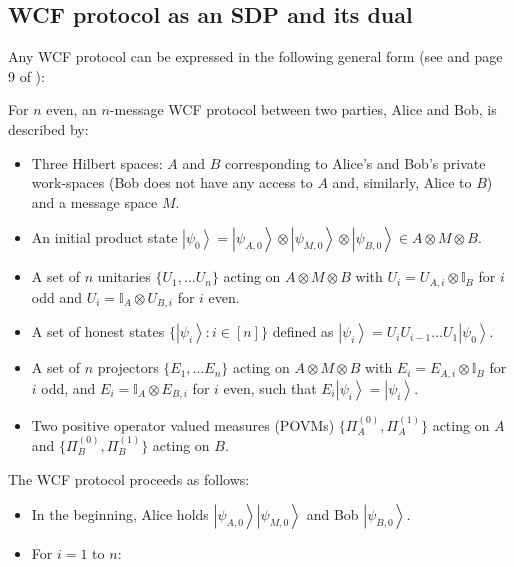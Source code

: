 \documentclass{theoretics}
\begin{document}
\subsection{WCF protocol as an SDP and its dual\label{subsec:sdp}}
Any WCF protocol can be expressed
in the following general form (see
\cite{Ambainis04b} and page 9 of \cite{Mochon07}): %
%

\begin{definition}
  \label{def:WCFprotocol}For $n$ even, an $n$-message WCF protocol
  between two parties, Alice and Bob, is described by:
  \begin{itemize}
    \item Three Hilbert spaces: $A$ and $B$ corresponding
          to Alice's and Bob's private work-spaces (Bob does not have any access
          to $A$ and, similarly, Alice to $B$) and a message space
          $M$.
    \item An initial product state $\left|\psi_{0}\right\rangle =\left|\psi_{A,0}\right\rangle \otimes\left|\psi_{M,0}\right\rangle \otimes\left|\psi_{B,0}\right\rangle \in A\otimes M\otimes B$.
    \item A set of $n$ unitaries $\{U_{1},\dots U_{n}\}$ acting on $A\otimes M\otimes B$
          with $U_{i}=U_{A,i}\otimes\mathbb{I}_{B}$ for $i$ odd
          and $U_{i}=\mathbb{I}_{A}\otimes U_{B,i}$ for $i$ even.
    \item A set of honest states $\{\left|\psi_{i}\right\rangle :i\in[n]\}$
          defined as $\left|\psi_{i}\right\rangle =U_{i}U_{i-1}\dots U_{1}\left|\psi_{0}\right\rangle $.
    \item A set of $n$ projectors $\{E_{1},\dots E_{n}\}$ acting on $A\otimes M\otimes B$
          with $E_{i}=E_{A,i}\otimes\mathbb{I}_{B}$ for $i$ odd,
          and $E_{i}=\mathbb{I}_{A}\otimes E_{B,i}$ for $i$ even,
          such that $E_{i}\left|\psi_{i}\right\rangle =\left|\psi_{i}\right\rangle $.
    \item Two positive operator valued measures (POVMs) $\{\Pi_{A}^{(0)},\Pi_{A}^{(1)}\}$
          acting on $A$ and $\{\Pi_{B}^{(0)},\Pi_{B}^{(1)}\}$ acting
          on $B$.
  \end{itemize}
  The WCF protocol proceeds as follows:
  \begin{itemize}
    \item In the beginning, Alice holds $\left|\psi_{A,0}\right\rangle \left|\psi_{M,0}\right\rangle $
          and Bob $\left|\psi_{B,0}\right\rangle $.
    \item For $i=1$ to $n$:

\end{itemize}
\end{definition}
\end{document}
